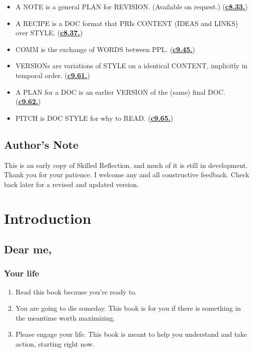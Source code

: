 \documentclass[
]{book}
\providecommand{\tightlist}{%
  \setlength{\itemsep}{0pt}\setlength{\parskip}{0pt}}
\begin{document}
\begin{itemize}
\item
  A NOTE is a general PLAN for REVISION. (Available on request.) (\protect\hyperlink{notes-and-peers}{\textbf{c8.33.}})\\
\item
  A RECIPE is a DOC format that PRIs CONTENT (IDEAS and LINKS) over STYLE. (\protect\hyperlink{doc-types}{\textbf{c8.37.}})\\
\item
  COMM is the exchange of WORDS between PPL. (\protect\hyperlink{style}{\textbf{c9.45.}})\\
\item
  VERSIONs are variations of STYLE on a identical CONTENT, implicitly in temporal order. (\protect\hyperlink{pris-differ}{\textbf{c9.61.}})\\
\item
  A PLAN for a DOC is an earlier VERSION of the (same) final DOC. (\protect\hyperlink{pris-differ}{\textbf{c9.62.}})\\
\item
  PITCH is DOC STYLE for why to READ. (\protect\hyperlink{norms-style}{\textbf{c9.65.}})
\end{itemize}

\hypertarget{authors-note}{%
\section{Author's Note}\label{authors-note}}

This is an early copy of Skilled Reflection, and much of it is still in development. Thank you for your patience. I welcome any and all constructive feedback. Check back later for a revised and updated version.

\hypertarget{introduction}{%
\chapter{Introduction}\label{introduction}}

\hypertarget{dear-me}{%
\section{Dear me,}\label{dear-me}}

\hypertarget{your-life}{%
\subsection{Your life}\label{your-life}}

\begin{enumerate}
\def\labelenumi{\arabic{enumi}.}
\tightlist
\item
  Read this book because you're ready to.
\item
  You are going to die someday. This book is for you if there is something in the
  meantime worth maximizing.
\item
  Please engage your life.
  This book is meant to help you understand and take action, starting right now.
\end{enumerate}
\end{document}
